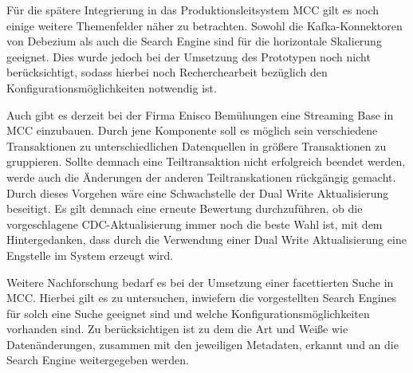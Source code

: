 Für die spätere Integrierung in das Produktionsleitsystem MCC gilt es noch einige weitere Themenfelder näher zu betrachten. Sowohl die Kafka-Konnektoren von Debezium als auch die Search Engine sind für die horizontale Skalierung geeignet. Dies wurde jedoch bei der Umsetzung des Prototypen noch nicht berücksichtigt, sodass hierbei noch Recherchearbeit bezüglich den Konfigurationsmöglichkeiten notwendig ist.

Auch gibt es derzeit bei der Firma Enisco Bemühungen eine Streaming Base in MCC einzubauen. Durch jene Komponente soll es möglich sein verschiedene Transaktionen zu unterschiedlichen Datenquellen in größere Transaktionen zu gruppieren. Sollte demnach eine Teiltransaktion nicht erfolgreich beendet werden, werde auch die Änderungen der anderen Teiltranskationen rückgängig gemacht. Durch dieses Vorgehen wäre eine Schwachstelle der \glqq Dual Write Aktualisierung\grqq{} beseitigt. Es gilt demnach eine erneute Bewertung durchzuführen, ob die vorgeschlagene \glqq CDC-Aktualisierung\grqq{} immer noch die beste Wahl ist, mit dem Hintergedanken, dass durch die Verwendung einer \glqq Dual Write Aktualisierung\grqq{} eine Engstelle im System erzeugt wird.

Weitere Nachforschung bedarf es bei der Umsetzung einer facettierten Suche in MCC. Hierbei gilt es zu untersuchen, inwiefern die vorgestellten Search Engines für solch eine Suche geeignet sind und welche Konfigurationsmöglichkeiten vorhanden sind. Zu berücksichtigen ist zu dem die Art und Weiße wie Datenänderungen, zusammen mit den jeweiligen Metadaten, erkannt und an die Search Engine weitergegeben werden.